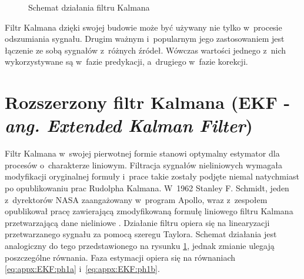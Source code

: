 \begin{figure}
	\caption{Schemat działania filtru Kalmana}
	\label{fig:appx:KF:algorithm}
\end{figure}

Filtr Kalmana dzięki swojej budowie może być używany nie tylko w~procesie odszumiania sygnału. Drugim ważnym i~popularnym jego zastosowaniem jest łączenie ze sobą sygnałów z~różnych źródeł. Wówczas wartości jednego z~nich wykorzystywane są w~fazie predykacji, a~drugiego w~fazie korekcji.


\section*{Rozszerzony filtr Kalmana (EKF - \emph{ang. Extended Kalman Filter})}
\label{sec:appx:filters:EKF}
Filtr Kalmana w~swojej pierwotnej formie stanowi optymalny estymator dla procesów o~charakterze liniowym. Filtracja sygnałów nieliniowych wymagała modyfikacji oryginalnej formuły i~prace takie zostały podjęte niemal natychmiast po opublikowaniu prac Rudolpha Kalmana. W~1962 Stanley F. Schmidt, jeden z~dyrektorów NASA zaangażowany w~program Apollo, wraz z~zespołem opublikował pracę zawierającą zmodyfikowaną formułę liniowego filtru Kalmana przetwarzającą dane nieliniowe \cite{smith1962application}. Działanie filtru opiera się na linearyzacji przetwarzanego sygnału za pomocą szeregu Taylora. Schemat działania jest analogiczny do tego przedstawionego na rysunku \ref{fig:appx:KF:algorithm}, jednak zmianie ulegają poszczególne równania. Faza estymacji opiera się na równaniach \eqref{eq:appx:EKF:ph1a} i~\eqref{eq:appx:EKF:ph1b}.

